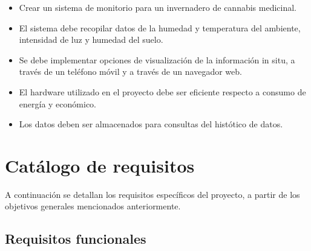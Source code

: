 \begin{itemize}
   \item Crear un sistema de monitorio para un invernadero de cannabis medicinal.
    \item El sistema debe recopilar datos de la humedad y temperatura del ambiente, intensidad de luz y humedad del suelo.
    \item Se debe implementar opciones de visualización de la información in situ, a través de un teléfono móvil y a través de un navegador web.
    \item El hardware utilizado en el proyecto debe ser eficiente respecto a consumo de energía y económico.
	\item Los datos deben ser almacenados para consultas del histótico de datos.
\end{itemize}
\section{Catálogo de requisitos}
A continuación se detallan los requisitos específicos del proyecto, a partir de los objetivos generales mencionados anteriormente.

\subsection{\textbf{Requisitos funcionales}}

